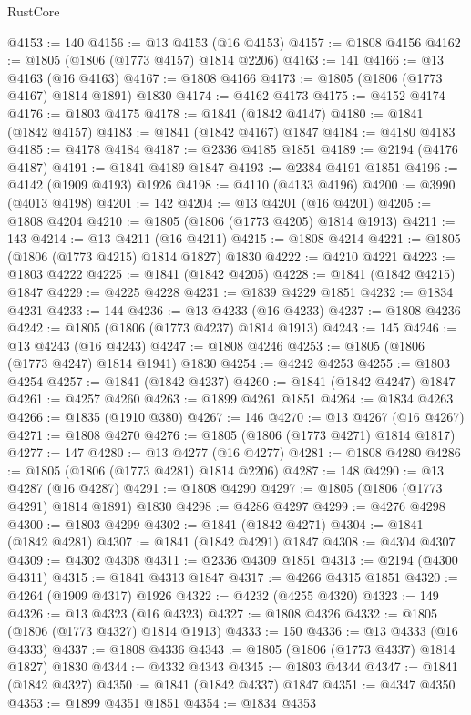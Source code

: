 \begin{lexlean}{RustCore}
\begin{coremodule}
@4153 := 140
@4156 := @13 @4153 (@16 @4153)
@4157 := @1808 @4156
@4162 := @1805 (@1806 (@1773 @4157) @1814 @2206)
@4163 := 141
@4166 := @13 @4163 (@16 @4163)
@4167 := @1808 @4166
@4173 := @1805 (@1806 (@1773 @4167) @1814 @1891) @1830
@4174 := @4162 @4173
@4175 := @4152 @4174
@4176 := @1803 @4175
@4178 := @1841 (@1842 @4147)
@4180 := @1841 (@1842 @4157)
@4183 := @1841 (@1842 @4167) @1847
@4184 := @4180 @4183
@4185 := @4178 @4184
@4187 := @2336 @4185 @1851
@4189 := @2194 (@4176 @4187)
@4191 := @1841 @4189 @1847
@4193 := @2384 @4191 @1851
@4196 := @4142 (@1909 @4193) @1926
@4198 := @4110 (@4133 @4196)
@4200 := @3990 (@4013 @4198)
@4201 := 142
@4204 := @13 @4201 (@16 @4201)
@4205 := @1808 @4204
@4210 := @1805 (@1806 (@1773 @4205) @1814 @1913)
@4211 := 143
@4214 := @13 @4211 (@16 @4211)
@4215 := @1808 @4214
@4221 := @1805 (@1806 (@1773 @4215) @1814 @1827) @1830
@4222 := @4210 @4221
@4223 := @1803 @4222
@4225 := @1841 (@1842 @4205)
@4228 := @1841 (@1842 @4215) @1847
@4229 := @4225 @4228
@4231 := @1839 @4229 @1851
@4232 := @1834 @4231
@4233 := 144
@4236 := @13 @4233 (@16 @4233)
@4237 := @1808 @4236
@4242 := @1805 (@1806 (@1773 @4237) @1814 @1913)
@4243 := 145
@4246 := @13 @4243 (@16 @4243)
@4247 := @1808 @4246
@4253 := @1805 (@1806 (@1773 @4247) @1814 @1941) @1830
@4254 := @4242 @4253
@4255 := @1803 @4254
@4257 := @1841 (@1842 @4237)
@4260 := @1841 (@1842 @4247) @1847
@4261 := @4257 @4260
@4263 := @1899 @4261 @1851
@4264 := @1834 @4263
@4266 := @1835 (@1910 @380)
@4267 := 146
@4270 := @13 @4267 (@16 @4267)
@4271 := @1808 @4270
@4276 := @1805 (@1806 (@1773 @4271) @1814 @1817)
@4277 := 147
@4280 := @13 @4277 (@16 @4277)
@4281 := @1808 @4280
@4286 := @1805 (@1806 (@1773 @4281) @1814 @2206)
@4287 := 148
@4290 := @13 @4287 (@16 @4287)
@4291 := @1808 @4290
@4297 := @1805 (@1806 (@1773 @4291) @1814 @1891) @1830
@4298 := @4286 @4297
@4299 := @4276 @4298
@4300 := @1803 @4299
@4302 := @1841 (@1842 @4271)
@4304 := @1841 (@1842 @4281)
@4307 := @1841 (@1842 @4291) @1847
@4308 := @4304 @4307
@4309 := @4302 @4308
@4311 := @2336 @4309 @1851
@4313 := @2194 (@4300 @4311)
@4315 := @1841 @4313 @1847
@4317 := @4266 @4315 @1851
@4320 := @4264 (@1909 @4317) @1926
@4322 := @4232 (@4255 @4320)
@4323 := 149
@4326 := @13 @4323 (@16 @4323)
@4327 := @1808 @4326
@4332 := @1805 (@1806 (@1773 @4327) @1814 @1913)
@4333 := 150
@4336 := @13 @4333 (@16 @4333)
@4337 := @1808 @4336
@4343 := @1805 (@1806 (@1773 @4337) @1814 @1827) @1830
@4344 := @4332 @4343
@4345 := @1803 @4344
@4347 := @1841 (@1842 @4327)
@4350 := @1841 (@1842 @4337) @1847
@4351 := @4347 @4350
@4353 := @1899 @4351 @1851
@4354 := @1834 @4353

\end{coremodule}
\end{lexlean}
